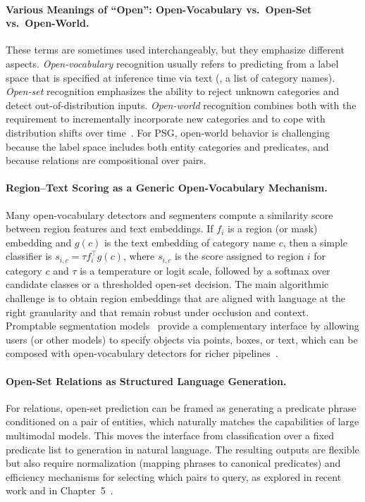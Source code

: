 \paragraph{Various Meanings of ``Open'': Open-Vocabulary vs.\ Open-Set vs.\ Open-World.}
These terms are sometimes used interchangeably, but they emphasize different aspects. \emph{Open-vocabulary} recognition usually refers to predicting from a label space that is specified at inference time via text (\eg, a list of category names). \emph{Open-set} recognition emphasizes the ability to reject unknown categories and detect out-of-distribution inputs. \emph{Open-world} recognition combines both with the requirement to incrementally incorporate new categories and to cope with distribution shifts over time~\citep{wu2024towards}. For PSG, open-world behavior is challenging because the label space includes both entity categories and predicates, and because relations are compositional over pairs.

\paragraph{Region--Text Scoring as a Generic Open-Vocabulary Mechanism.}
Many open-vocabulary detectors and segmenters compute a similarity score between region features and text embeddings. If $f_i$ is a region (or mask) embedding and $g(c)$ is the text embedding of category name $c$, then a simple classifier is $s_{i,c}=\tau f_i^\top g(c)$, where $s_{i,c}$ is the score assigned to region $i$ for category $c$ and $\tau$ is a temperature or logit scale, followed by a softmax over candidate classes or a thresholded open-set decision. The main algorithmic challenge is to obtain region embeddings that are aligned with language at the right granularity and that remain robust under occlusion and context. Promptable segmentation models~\citep{kirillov2023segment} provide a complementary interface by allowing users (or other models) to specify objects via points, boxes, or text, which can be composed with open-vocabulary detectors for richer pipelines~\citep{ren2024grounded}.

\paragraph{Open-Set Relations as Structured Language Generation.}
For relations, open-set prediction can be framed as generating a predicate phrase conditioned on a pair of entities, which naturally matches the capabilities of large multimodal models. This moves the interface from classification over a fixed predicate list to generation in natural language. The resulting outputs are flexible but also require normalization (mapping phrases to canonical predicates) and efficiency mechanisms for selecting which pairs to query, as explored in recent work and in Chapter~5~\citep{chen2023expanding, zhou2025openpsg}.

